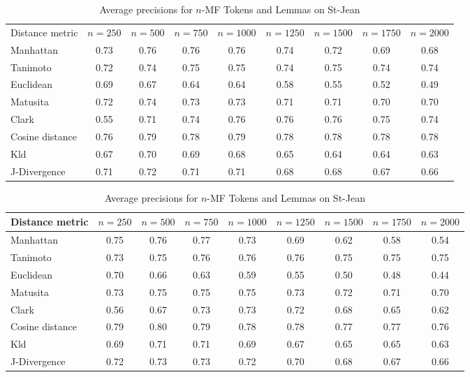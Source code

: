 \onecolumn

\begin{table}[H]
  \centering
  \caption{Average precisions for $n$-MF Tokens and Lemmas on St-Jean}
  \label{tab:tokens_lemmas}

  \label{tab:tokens}
  \begin{tabular}{l c c c c c c c c}
    \toprule
    Distance metric &
    $n=250$ &
    $n=500$ &
    $n=750$ &
    $n=1000$ &
    $n=1250$ &
    $n=1500$ &
    $n=1750$ &
    $n=2000$ \\
    Manhattan       & 0.73 & 0.76 & 0.76 & 0.76 & 0.74 & 0.72 & 0.69 & 0.68 \\
    Tanimoto        & 0.72 & 0.74 & 0.75 & 0.75 & 0.74 & 0.75 & 0.74 & 0.74 \\
    Euclidean       & 0.69 & 0.67 & 0.64 & 0.64 & 0.58 & 0.55 & 0.52 & 0.49 \\
    Matusita        & 0.72 & 0.74 & 0.73 & 0.73 & 0.71 & 0.71 & 0.70 & 0.70 \\
    Clark           & 0.55 & 0.71 & 0.74 & 0.76 & 0.76 & 0.76 & 0.75 & 0.74 \\
    Cosine distance & 0.76 & 0.79 & 0.78 & 0.79 & 0.78 & 0.78 & 0.78 & 0.78 \\
    Kld             & 0.67 & 0.70 & 0.69 & 0.68 & 0.65 & 0.64 & 0.64 & 0.63 \\
    J-Divergence    & 0.71 & 0.72 & 0.71 & 0.71 & 0.68 & 0.68 & 0.67 & 0.66 \\
    \bottomrule
  \end{tabular}

  \vspace{0.5cm}

  \label{tab:lemmas}
  \begin{tabular}{l c c c c c c c c}
    \toprule
    Distance metric &
    $n=250$ &
    $n=500$ &
    $n=750$ &
    $n=1000$ &
    $n=1250$ &
    $n=1500$ &
    $n=1750$ &
    $n=2000$ \\
    \midrule
    Manhattan       & 0.75 & 0.76 & 0.77 & 0.73 & 0.69 & 0.62 & 0.58 & 0.54 \\
    Tanimoto        & 0.73 & 0.75 & 0.76 & 0.76 & 0.76 & 0.75 & 0.75 & 0.75 \\
    Euclidean       & 0.70 & 0.66 & 0.63 & 0.59 & 0.55 & 0.50 & 0.48 & 0.44 \\
    Matusita        & 0.73 & 0.75 & 0.75 & 0.75 & 0.73 & 0.72 & 0.71 & 0.70 \\
    Clark           & 0.56 & 0.67 & 0.73 & 0.73 & 0.72 & 0.68 & 0.65 & 0.62 \\
    Cosine distance & 0.79 & 0.80 & 0.79 & 0.78 & 0.78 & 0.77 & 0.77 & 0.76 \\
    Kld             & 0.69 & 0.71 & 0.71 & 0.69 & 0.67 & 0.65 & 0.65 & 0.63 \\
    J-Divergence    & 0.72 & 0.73 & 0.73 & 0.72 & 0.70 & 0.68 & 0.67 & 0.66 \\
    \bottomrule
  \end{tabular}
\end{table}


